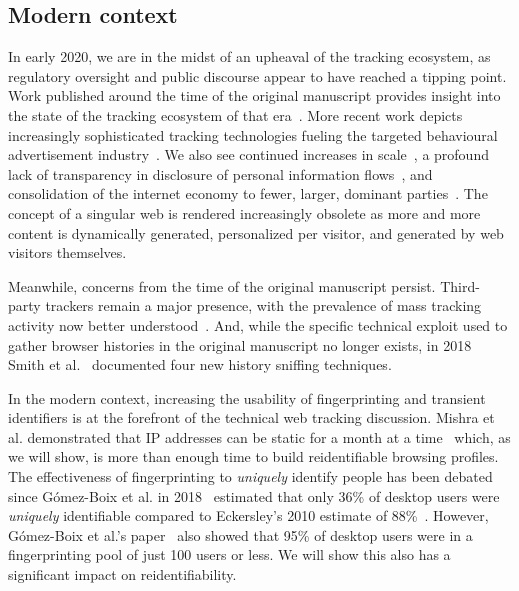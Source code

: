 \documentclass[letterpaper,twocolumn,10pt]{article}
\begin{document}
\subsection{Modern context}
\label{ssec:modern-context}
%
In early 2020, we are in the midst of an upheaval of the tracking ecosystem, as regulatory oversight and public discourse appear to have reached a tipping point. 
Work published around the time of the original manuscript provides insight into the state of the tracking ecosystem of that era~\cite{180596,10.1145/2660267.2660347,Banse_2012,inproceedingsbanse2012-2}. 
More recent work depicts increasingly sophisticated tracking technologies fueling the targeted behavioural advertisement industry~\cite{10.1145/3308558.3313542,10.1145/3131365.3131387,10.1145/3131365.3131397}.
We also see continued increases in scale~\cite{JWS-0014}, a profound lack of transparency in disclosure of personal information flows~\cite{Libery-Web-xray}, and consolidation of the internet economy to fewer, larger, dominant parties~\cite{internet-society-2019}.
The concept of a singular web is rendered increasingly obsolete as more and more content is dynamically generated, personalized per visitor, and generated by web visitors themselves. 

Meanwhile, concerns from the time of the original manuscript persist.
Third-party trackers remain a major presence, with the prevalence of mass tracking activity now better understood~\cite{zeberwww2020, 10.1145/3178876.3186097,8270427,10.1145/2875475.2875479,InferringHeaderBidding,DBLP:journals/corr/IkramAKKM16,DBLP:journals/corr/abs-1804-08959}.
And, while the specific technical exploit used to gather browser histories in the original manuscript no longer exists, in 2018 Smith et al.~\cite{smithBrowserHistoryRe2018} documented four new history sniffing techniques. 

In the modern context, increasing the usability of fingerprinting and transient identifiers is at the forefront of the technical web tracking discussion. 
Mishra et al. demonstrated that IP addresses can be static for a month at a time~\cite{mishra:hal-02435622} which, as we will show, is more than enough time to build reidentifiable browsing profiles. 
The effectiveness of fingerprinting to \textit{uniquely} identify people has been debated since G\'{o}mez-Boix et al. in 2018~\cite{10.1145/3178876.3186097} estimated that only 36\% of desktop users were \textit{uniquely} identifiable compared to Eckersley's 2010 estimate of 88\%~\cite{Eckersley10howunique}. 
However, G\'{o}mez-Boix et al.'s paper~\cite{10.1145/3178876.3186097} also showed that 95\% of desktop users were in a fingerprinting pool of just 100 users or less.
We will show this also has a significant impact on reidentifiability.
\end{document}
